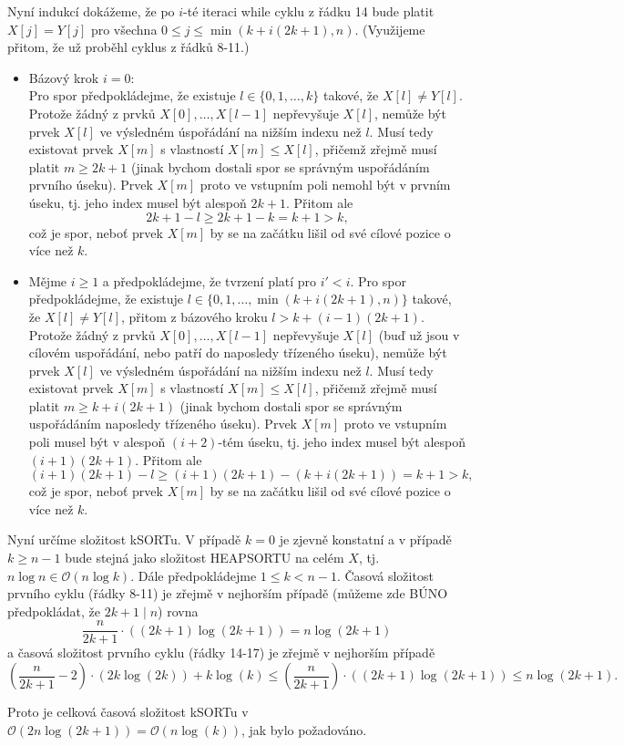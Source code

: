 \documentclass[12pt,a4paper]{article}
\theoremstyle{plain}
\begin{document}
Nyní indukcí dokážeme, že po $i$-té iteraci while cyklu z řádku 14 bude platit $X[j]=Y[j]$ pro všechna $0\leq j \leq \min(k+i(2k+1),n)$. (Využijeme přitom, že už proběhl cyklus z řádků 8-11.)
\begin{itemize}
\item Bázový krok $i=0$:\\
Pro spor předpokládejme, že existuje $l\in\{0,1,\dots,k\}$ takové, že $X[l]\neq Y[l]$. Protože žádný z prvků $X[0],\dots,X[l-1]$ nepřevyšuje $X[l]$, nemůže být prvek $X[l]$ ve výsledném úspořádání na nižším indexu než $l$. Musí tedy existovat prvek $X[m]$ s vlastností $X[m]\leq X[l]$, přičemž zřejmě musí platit $m\geq 2k+1$ (jinak bychom dostali spor se správným uspořádáním prvního úseku). Prvek $X[m]$ proto ve vstupním poli nemohl být v prvním úseku, tj. jeho index musel být alespoň $2k+1$. Přitom ale $$2k+1-l\geq 2k+1-k=k+1>k,$$ což je spor, neboť prvek $X[m]$ by se na začátku lišil od své cílové pozice o více než $k$. 
\item Mějme $i\geq 1$ a předpokládejme, že tvrzení platí pro $i'< i$. Pro spor předpokládejme, že existuje $l\in\{0,1,\dots,\min(k+i(2k+1),n)\}$ takové, že $X[l]\neq Y[l]$, přitom z bázového kroku $l>k+(i-1)(2k+1)$. Protože žádný z prvků $X[0],\dots,X[l-1]$ nepřevyšuje $X[l]$ (buď už jsou v cílovém uspořádání, nebo patří do naposledy třízeného úseku), nemůže být prvek $X[l]$ ve výsledném úspořádání na nižším indexu než $l$. Musí tedy existovat prvek $X[m]$ s vlastností $X[m]\leq X[l]$, přičemž zřejmě musí platit $m\geq k+i(2k+1)$ (jinak bychom dostali spor se správným uspořádáním naposledy třízeného úseku). Prvek $X[m]$ proto ve vstupním poli musel být v alespoň $(i+2)$-tém úseku, tj. jeho index musel být alespoň $(i+1)(2k+1)$. Přitom ale $$(i+1)(2k+1)-l\geq (i+1)(2k+1)-(k+i(2k+1))=k+1>k,$$ což je spor, neboť prvek $X[m]$ by se na začátku lišil od své cílové pozice o více než $k$. 
\end{itemize}

Nyní určíme složitost kSORTu. V případě $k=0$ je zjevně konstatní a v případě $k\geq n-1$ bude stejná jako složitost HEAPSORTU na celém $X$, tj. $n\log n\in\mathcal{O}(n\log k)$. Dále předpokládejme $1\leq k<n-1$. Časová složitost prvního cyklu (řádky 8-11) je zřejmě v nejhorším případě (můžeme zde BÚNO předpokládat, že $2k+1\mid n$) rovna
$$\frac{n}{2k+1}\cdot ((2k+1)\log(2k+1))=n\log (2k+1)$$
a časová složitost prvního cyklu (řádky 14-17) je zřejmě v nejhorším případě
\begin{equation*}
\left(\frac{n}{2k+1}-2\right)\cdot (2k\log(2k))+k\log(k)\leq \left(\frac{n}{2k+1}\right)\cdot ((2k+1)\log(2k+1))\leq n\log(2k+1).
\end{equation*}

Proto je celková časová složitost kSORTu v $\mathcal{O}(2n\log(2k+1))=\mathcal{O}(n\log(k))$, jak bylo požadováno.
\end{document}
